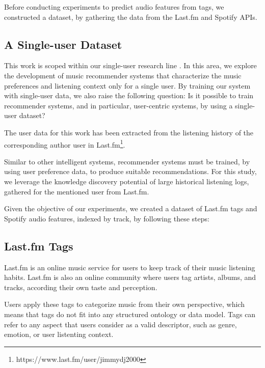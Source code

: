 \documentclass[sn-mathphys]{sn-jnl}%
\theoremstyle{thmstyleone}%
\theoremstyle{thmstyletwo}%
\theoremstyle{thmstylethree}%
\begin{document}


Before conducting experiments to predict audio features from tags,
we constructed a dataset, by gathering the data from the Last.fm and Spotify APIs.

\subsection{A Single-user Dataset}

This work is scoped within our single-user research line \cite{ramirez2022user}.
In this area, we explore the development of music recommender systems that
characterize the music preferences and listening context only for a single user.
By training our system with single-user data, we also raise the following question: Is it possible to train
recommender systems, and in particular, user-centric systems, by using a single-user dataset?

The user data for this work has been extracted from the
listening history of the corresponding author user in Last.fm\footnote[5]{https://www.last.fm/user/jimmydj2000}.


Similar to other intelligent systems, recommender systems
must be trained, by using user preference data, to produce
suitable recommendations. For this study,
we leverage the knowledge discovery potential
of large historical listening logs, gathered for the mentioned user from Last.fm.

Given the objective of our experiments,
we created a dataset of Last.fm tags and Spotify audio features, indexed by track, by following these steps:



\subsection{Last.fm Tags}

Last.fm is an online music service for users to keep track of their music listening habits.
Last.fm is also an online community where users tag artists, albums, and tracks, according their own taste and perception.

Users apply these tags to
categorize music from their own perspective, which
means that tags do not fit into any structured ontology
or data model.
Tags can refer to any aspect that users consider as a valid descriptor, such as genre,
emotion, or user listenting context.
\end{document}

